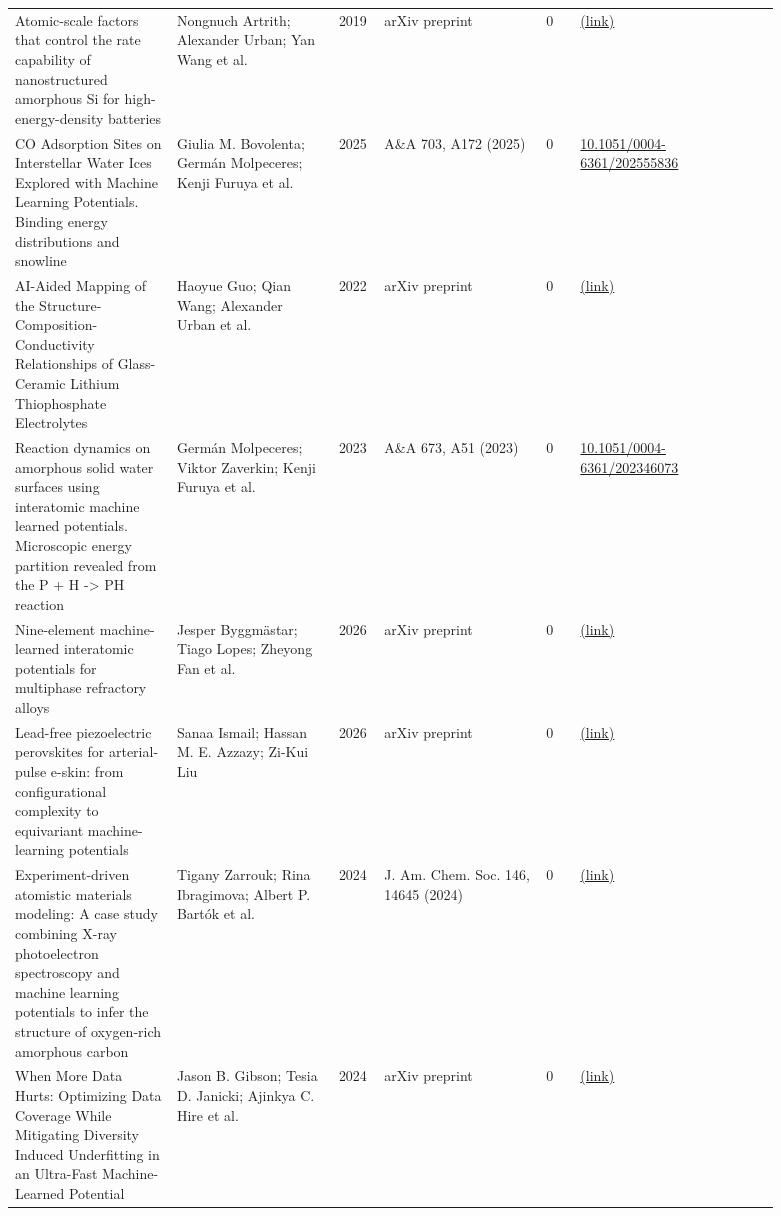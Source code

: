 \documentclass[10pt,a4paper]{article}
\begin{document}
{\begin{longtable}{p{0.192\linewidth}p{0.192\linewidth}p{0.043\linewidth}p{0.192\linewidth}p{0.043\linewidth}p{0.132\linewidth}p{0.096\linewidth}}
Atomic-scale factors that control the rate capability of nanostructured amorphous Si for high-energy-density batteries & Nongnuch Artrith; Alexander Urban; Yan Wang et al. & 2019 & arXiv preprint & 0 & \href{http://arxiv.org/abs/1901.09272v1}{(link)} &  \\
CO Adsorption Sites on Interstellar Water Ices Explored with Machine Learning Potentials. Binding energy distributions and snowline & Giulia M. Bovolenta; Germán Molpeceres; Kenji Furuya et al. & 2025 & A\&A 703, A172 (2025) & 0 & \href{https://doi.org/10.1051/0004-6361/202555836}{10.1051/0004-6361/202555836} &  \\
AI-Aided Mapping of the Structure-Composition-Conductivity Relationships of Glass-Ceramic Lithium Thiophosphate Electrolytes & Haoyue Guo; Qian Wang; Alexander Urban et al. & 2022 & arXiv preprint & 0 & \href{http://arxiv.org/abs/2201.11203v1}{(link)} &  \\
Reaction dynamics on amorphous solid water surfaces using interatomic machine learned potentials. Microscopic energy partition revealed from the P + H -> PH reaction & Germán Molpeceres; Viktor Zaverkin; Kenji Furuya et al. & 2023 & A\&A 673, A51 (2023) & 0 & \href{https://doi.org/10.1051/0004-6361/202346073}{10.1051/0004-6361/202346073} &  \\
Nine-element machine-learned interatomic potentials for multiphase refractory alloys & Jesper Byggmästar; Tiago Lopes; Zheyong Fan et al. & 2026 & arXiv preprint & 0 & \href{http://arxiv.org/abs/2603.04147v1}{(link)} &  \\
Lead-free piezoelectric perovskites for arterial-pulse e-skin: from configurational complexity to equivariant machine-learning potentials & Sanaa Ismail; Hassan M. E. Azzazy; Zi-Kui Liu & 2026 & arXiv preprint & 0 & \href{http://arxiv.org/abs/2609.00580v1}{(link)} &  \\
Experiment-driven atomistic materials modeling: A case study combining X-ray photoelectron spectroscopy and machine learning potentials to infer the structure of oxygen-rich amorphous carbon & Tigany Zarrouk; Rina Ibragimova; Albert P. Bartók et al. & 2024 & J. Am. Chem. Soc. 146, 14645 (2024) & 0 & \href{http://arxiv.org/abs/2402.03219v2}{(link)} &  \\
When More Data Hurts: Optimizing Data Coverage While Mitigating Diversity Induced Underfitting in an Ultra-Fast Machine-Learned Potential & Jason B. Gibson; Tesia D. Janicki; Ajinkya C. Hire et al. & 2024 & arXiv preprint & 0 & \href{http://arxiv.org/abs/2409.07610v1}{(link)} &  \\

\end{longtable}}
\end{document}
